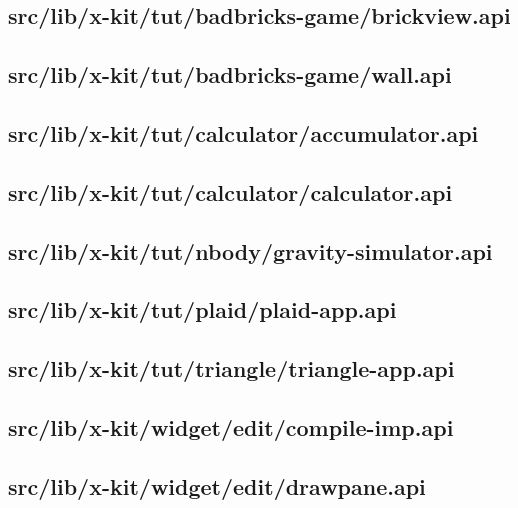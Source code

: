 \subsection{src/lib/x-kit/tut/badbricks-game/brickview.api}


\subsection{src/lib/x-kit/tut/badbricks-game/wall.api}


\subsection{src/lib/x-kit/tut/calculator/accumulator.api}


\subsection{src/lib/x-kit/tut/calculator/calculator.api}


\subsection{src/lib/x-kit/tut/nbody/gravity-simulator.api}


\subsection{src/lib/x-kit/tut/plaid/plaid-app.api}


\subsection{src/lib/x-kit/tut/triangle/triangle-app.api}


\subsection{src/lib/x-kit/widget/edit/compile-imp.api}


\subsection{src/lib/x-kit/widget/edit/drawpane.api}


